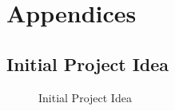 
\chapter{Appendices}

\section{Initial Project Idea}\label{appendix:initIdea}
\begin{figure}[!htbp]
    \centering
    \noindent\begin{subfigure}[b]{\textwidth}
        \centering
    \end{subfigure}
\caption{Initial Project Idea}
\end{figure}
\FloatBarrier
\newpage


